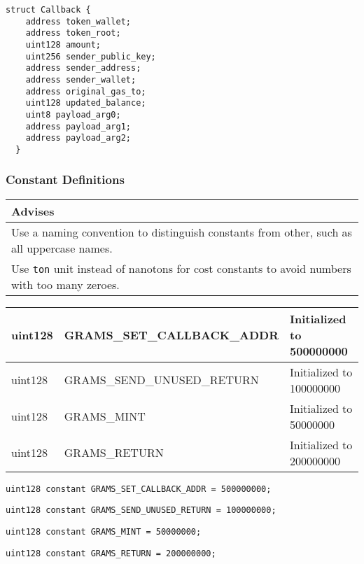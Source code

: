 \begin{lstlisting}[firstnumber=48]
  struct Callback {
    address token_wallet;
    address token_root;
    uint128 amount;
    uint256 sender_public_key;
    address sender_address;
    address sender_wallet;
    address original_gas_to;
    uint128 updated_balance;
    uint8 payload_arg0;
    address payload_arg1;
    address payload_arg2;
  }
\end{lstlisting}

\subsubsection{Constant Definitions}


\ifsoldraft
\noindent\begin{tabular}{|p{12cm}|}\hline
\rowcolor{green}Advises
\\\hline
Use a naming convention to distinguish constants from other, such as all uppercase names.
\\\hline
Use \verb+ton+ unit instead of nanotons for cost constants to avoid numbers with too many zeroes.
\\\hline\end{tabular}
\fi

\ifsoltables
\noindent\begin{tabular}{|l|l|p{5cm}|}\hline
uint128 & GRAMS\_{}SET\_{}CALLBACK\_{}ADDR & Initialized to 500000000  \\\hline
uint128 & GRAMS\_{}SEND\_{}UNUSED\_{}RETURN & Initialized to 100000000  \\\hline
uint128 & GRAMS\_{}MINT & Initialized to 50000000  \\\hline
uint128 & GRAMS\_{}RETURN & Initialized to 200000000  \\\hline
\end{tabular}
\fi


\begin{lstlisting}[firstnumber=65]
  uint128 constant GRAMS_SET_CALLBACK_ADDR = 500000000;
\end{lstlisting}

\begin{lstlisting}[firstnumber=66]
  uint128 constant GRAMS_SEND_UNUSED_RETURN = 100000000;
\end{lstlisting}

\begin{lstlisting}[firstnumber=67]
  uint128 constant GRAMS_MINT = 50000000;
\end{lstlisting}

\begin{lstlisting}[firstnumber=68]
  uint128 constant GRAMS_RETURN = 200000000;
\end{lstlisting}

